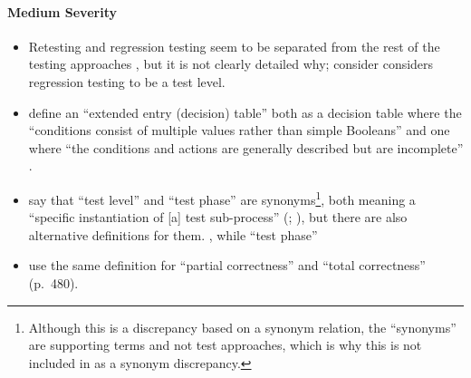 \paragraph{Medium Severity}
\begin{itemize}\fi
      \item %
            Retesting and regression testing seem to be separated from the rest
            of the testing approaches \citep[p.~23]{IEEE2022}, but it is not
            clearly detailed why; \citet[p.~3]{BarbosaEtAl2006} \ifnotpaper
                  consider \else considers \fi regression testing to be a test level.
            \ifnotpaper
      \item %
            \citeauthor{IEEE2021} define an ``extended entry (decision) table''
            both as a decision table where the ``conditions consist of multiple
            values rather than simple Booleans'' \citeyearpar[p.~18]{IEEE2021}
            and one where ``the conditions and actions are generally described
            but are incomplete'' \citeyearpar[p.~175]{IEEE2017}.
      \item %
            \citeauthor*{IEEE2017} say that ``test level'' and ``test phase''
            are synonyms\footnote{Although this is a discrepancy based on a
                  synonym relation, the ``synonyms'' are supporting terms and
                  not test approaches, which is why this is not included in
                   as a synonym discrepancy.}, both meaning a
            ``specific instantiation of [a] test sub-process''
            (\citeyear[pp.~469,~470]{IEEE2017}; \citeyear[p.~9]{IEEE2013}), but
            there are also alternative definitions for them.
            \procLevel{\citeyearpar}, while ``test phase'' \phaseDef{}
      \item \citeauthor{IEEE2017} use the same definition for ``partial correctness''
            \citeyearpar[p.~314]{IEEE2017} and ``total correctness'' (p.~480).
            \fi
\end{itemize}

\ifnotpaper

